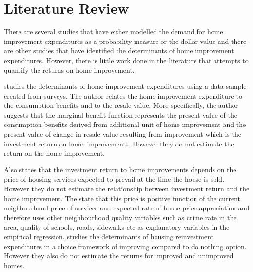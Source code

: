 \documentclass{article}
\begin{document}
\section{Literature Review}

There are several studies that have either modelled the demand for home improvement expenditures as a probability measure or the dollar value and there are other studies that have identified the determinants of home improvement expenditures. However, there is little work done in the literature that attempts to quantify the returns on home improvement.

\citet{boehm1986improvement} studies the determinants of home improvement expenditures using a data sample created from surveys. The author relates the home improvement expenditure to the consumption benefits and to the resale value. More specifically, the author suggests that the marginal benefit function represents the present value of the consumption benefits derived from additional unit of home improvement and the present value of change in resale value resulting from improvement which is the investment return on home improvements. However they do not estimate the return on the home improvement.

Also \citet{boehm1986improvement} states that the investment return to home improvements depends on the price of housing services expected to prevail at the time the house is sold. However they do not estimate the relationship between investment return and the home improvement. The state that this price is positive function of the current neighbourhood price of services and expected rate of house price appreciation and therefore uses other neighbourhood quality variables such as crime rate in the area, quality of schools, roads, sidewalks etc as explanatory variables in the empirical regression. \citet{galster1987homeowners} studies the determinants of housing reinvestment expenditures in a choice framework of improving compared to do nothing option. However they also do not estimate the returns for improved and unimproved homes.
\end{document}
